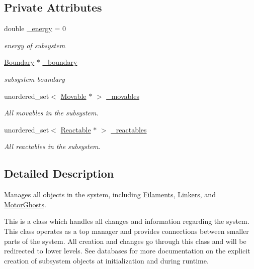 \subsection*{Private Attributes}
\begin{DoxyCompactItemize}
\item 
double \hyperlink{classSubSystem_ad6f7f51491f99102870b8907926acc40}{\+\_\+energy} = 0
\begin{DoxyCompactList}\small\item\em energy of subsystem \end{DoxyCompactList}\item 
\hyperlink{classBoundary}{Boundary} $\ast$ \hyperlink{classSubSystem_a5500deb6aaeccd7418d264ff4e54484f}{\+\_\+boundary}
\begin{DoxyCompactList}\small\item\em subsystem boundary \end{DoxyCompactList}\item 
unordered\+\_\+set$<$ \hyperlink{classMovable}{Movable} $\ast$ $>$ \hyperlink{classSubSystem_a746593123598cdda62ba3d3c51d31111}{\+\_\+movables}
\begin{DoxyCompactList}\small\item\em All movables in the subsystem. \end{DoxyCompactList}\item 
unordered\+\_\+set$<$ \hyperlink{classReactable}{Reactable} $\ast$ $>$ \hyperlink{classSubSystem_af9ffdc91d0631686e9f433729a216858}{\+\_\+reactables}
\begin{DoxyCompactList}\small\item\em All reactables in the subsystem. \end{DoxyCompactList}\end{DoxyCompactItemize}


\subsection{Detailed Description}
Manages all objects in the system, including \hyperlink{classFilament}{Filaments}, \hyperlink{classLinker}{Linkers}, and \hyperlink{classMotorGhost}{Motor\+Ghosts}. 

This is a class which handles all changes and information regarding the system. This class operates as a top manager and provides connections between smaller parts of the system. All creation and changes go through this class and will be redirected to lower levels. See databases for more documentation on the explicit creation of subsystem objects at initialization and during runtime. 

